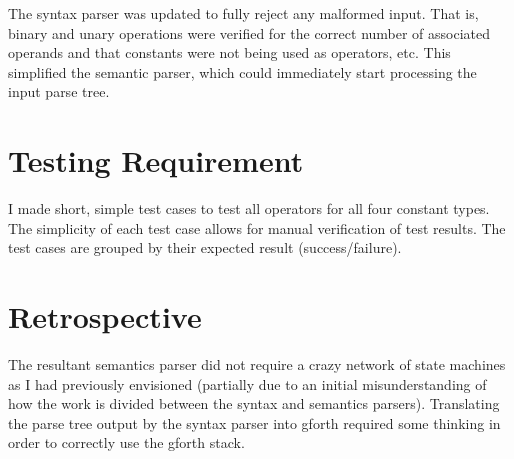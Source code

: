 \documentclass[12pt,letterpaper]{article}
\begin{document}
The syntax parser was updated to fully reject any malformed input. That is,
binary and unary operations were verified for the correct number of associated
operands and that constants were not being used as operators, etc. This
simplified the semantic parser, which could immediately start processing the
input parse tree.

\section*{Testing Requirement}

I made short, simple test cases to test all operators for all four constant
types. The simplicity of each test case allows for manual verification of test
results. The test cases are grouped by their expected result (success/failure).

\section*{Retrospective}

The resultant semantics parser did not require a crazy network of state
machines as I had previously envisioned (partially due to an initial
misunderstanding of how the work is divided between the syntax and semantics
parsers). Translating the parse tree output by the syntax parser into gforth
required some thinking in order to correctly use the gforth stack.
\end{document}
